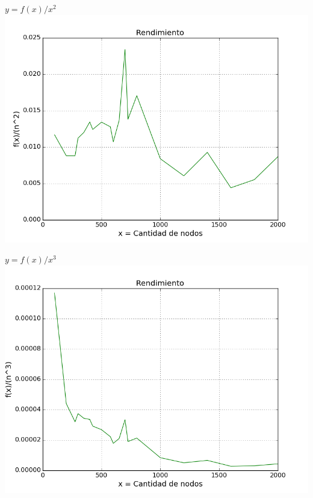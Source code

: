 \begin{center}
	\textbf{$y = f(x)/x^2$}\\
	\includegraphics[scale=0.7]{experimentos/bqlocal/rendimiento_aristas_cuadraticas_3/complexity_med_over_n_square.png}
\end{center}

\begin{center}
	\textbf{$y = f(x)/x^3$}\\
	\includegraphics[scale=0.7]{experimentos/bqlocal/rendimiento_aristas_cuadraticas_3/complexity_med_over_n_cube.png}
\end{center}

